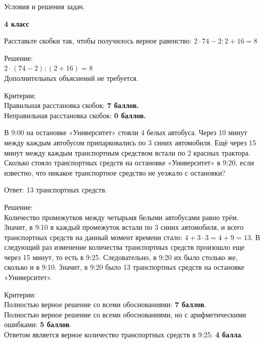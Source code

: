 \centerline{\Huge Условия и решения задач.}
\centerline{\bf \Huge 4 класс}
 
 Расставьте скобки так, чтобы получилось верное равенство: 
$2 \cdot 74 - 2 : 2 + 16 = 8$

\hspace{3mm}

Решение:\\ 
$2 \cdot (74 - 2) : (2 + 16) = 8$ \\
Дополнительных объяснений не требуется.

\hspace{3mm}

Критерии:\\
Правильная расстановка скобок: \textbf{7 баллов.}\\
Неправильная расстановка скобок: \textbf{0 баллов.}

\hspace{3mm}

 В 9:00 на остановке «Университет» стояли 4 белых автобуса. Через 10 минут между каждым автобусом припарковались по 3 синих автомобиля. Ещё через 15 минут между каждым транспортным средством встали по 2 красных трактора. Сколько стояло транспортных средств на остановке «Университет» в 9:20, если известно, что никакое транспортное средство не уезжало с остановки?

\hspace{3mm}

Ответ: 13 транспортных средств.

Решение:\\
Количество промежутков между четырьмя белыми автобусами равно трём. Значит, в 9:10 в каждый промежуток встали по 3 синих автомобиля, и всего транспортных средств на данный момент времени стало: $4 + 3 \cdot 3 = 4 + 9 = 13.$ В следующий раз изменение количества транспортных средств произошло еще через 15 минут, то есть в 9:25. Следовательно, в 9:20 их было столько же, сколько и в 9:10. Значит, в 9:20 было 13 транспортных средств на остановке «Университет».

\hspace{3mm}

Критерии:\\
Полностью верное решение со всеми обоснованиями: \textbf{7 баллов}.\\
Полностью верное решение со всеми обоснованиями, но с арифметическими ошибками: \textbf{5 баллов}.\\
Ответом является верное количество транспортных средств в 9:25: \textbf{4 балла}.\\
\newpage
\hspace{10mm}

